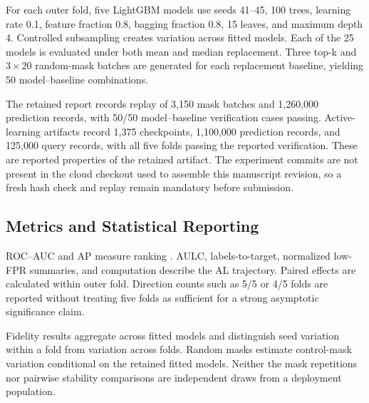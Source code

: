 For each outer fold, five LightGBM models use seeds 41--45, 100 trees, learning
rate 0.1, feature fraction 0.8, bagging fraction 0.8, 15 leaves, and maximum
depth 4. Controlled subsampling creates variation across fitted models. Each of
the 25 models is evaluated under both mean and median replacement. Three top-k
and $3\times20$ random-mask batches are generated for each replacement baseline,
yielding 50 model--baseline combinations.

The retained report records replay of 3,150 mask batches and 1,260,000 prediction
records, with 50/50 model--baseline verification cases passing. Active-learning
artifacts record 1,375 checkpoints, 1,100,000 prediction records, and 125,000
query records, with all five folds passing the reported verification. These are
reported properties of the retained artifact. The experiment commits are not
present in the cloud checkout used to assemble this manuscript revision, so a
fresh hash check and replay remain mandatory before submission.

\subsection{Metrics and Statistical Reporting}

ROC--AUC and AP measure ranking \cite{fawcett2006roc,saito2015precision}. AULC,
labels-to-target, normalized low-FPR summaries, and computation describe the AL
trajectory. Paired effects are calculated within outer fold. Direction counts
such as 5/5 or 4/5 folds are reported without treating five folds as sufficient
for a strong asymptotic significance claim.

Fidelity results aggregate across fitted models and distinguish seed variation
within a fold from variation across folds. Random masks estimate control-mask
variation conditional on the retained fitted models. Neither the mask repetitions
nor pairwise stability comparisons are independent draws from a deployment
population.
